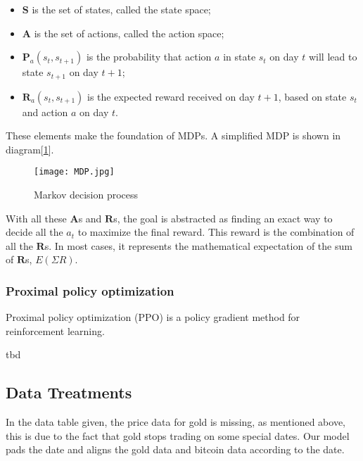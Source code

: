 \documentclass{mcmthesis}
\begin{document}
\begin{itemize}
  \item $\pmb{S}$ is the set of states, called the state space;
  \item $\pmb{A}$ is the set of actions, called the action space;
  \item $\pmb{P}_a(s_t, s_{t+1})$ is the probability that action $a$ in state $s_t$ on day $t$ will lead to state $s_{t+1}$ on day $t+1$;
  \item $\pmb{R}_a(s_t, s_{t+1})$ is the expected reward received on day $t+1$, based on state $s_t$ and action $a$ on day $t$.
\end{itemize}

These elements make the foundation of MDPs.
A simplified MDP is shown in diagram[\ref{MDP}].

\begin{figure}[h]
  \small
  \centering
  \texttt{[image: MDP.jpg]}
  \caption{Markov decision process} \label{MDP}
\end{figure}

With all these $\pmb{A}$s and $\pmb{R}$s,
the goal is abstracted as finding an exact way to decide all the $a_t$
to maximize the final reward.
This reward is the combination of all the $\pmb{R}$s.
In most cases, it represents the mathematical expectation of the sum of $\pmb{R}$s,
$E(\Sigma R)$.

\subsubsection{Proximal policy optimization}

Proximal policy optimization (PPO) is a policy gradient method for reinforcement learning.

tbd

\subsection{Data Treatments}



In the data table given, the price data for gold is missing, as mentioned above, this is due to the fact that gold stops trading on some special dates. Our model pads the date and aligns the gold data and bitcoin data according to the date.
\end{document}

